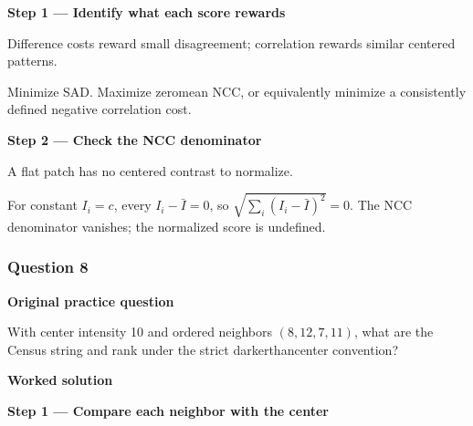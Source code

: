 \documentclass[letterpaper,11pt,english,openany,oneside]{jupyterBook}
\begin{document}
\par\medskip{}
{\color{QuizStepRed}\bfseries Step 1 — Identify what each score rewards}\par\smallskip

\sphinxAtStartPar
{} Difference costs reward small disagreement; correlation rewards similar centered patterns.

\sphinxAtStartPar
Minimize SAD. Maximize zero\sphinxhyphen{}mean NCC, or equivalently minimize a consistently defined negative correlation cost.

\par

\par\medskip{}
{\color{QuizStepRed}\bfseries Step 2 — Check the NCC denominator}\par\smallskip

\sphinxAtStartPar
{} A flat patch has no centered contrast to normalize.

\sphinxAtStartPar
For constant {\color{QuizMathBlue} \(I_i=c\)}, every {\color{QuizMathBlue} \(I_i-\bar I=0\)}, so {\color{QuizMathBlue} \(\sqrt{\sum_i(I_i-\bar I)^2}=0\)}. The NCC denominator vanishes; the normalized score is undefined.

\par

\par\medskip


\subsubsection{Question 8}
\label{\detokenize{lectures/lecture04/tldr:question-8}}\label{\detokenize{lectures/lecture04/tldr:lec04-tldr-q8}}
\par\medskip\textbf{Original practice question}\par\smallskip

\sphinxAtStartPar
With center intensity 10 and ordered neighbors \((8,12,7,11)\), what are the Census string and rank under the strict darker\sphinxhyphen{}than\sphinxhyphen{}center convention?

\par\medskip

\par\medskip
\textbf{Worked solution}\par\smallskip

\par\medskip{}
{\color{QuizStepRed}\bfseries Step 1 — Compare each neighbor with the center}\par\smallskip
\end{document}
